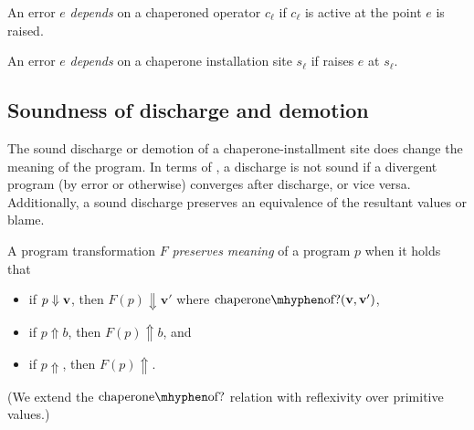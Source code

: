 
\begin{definition}
An error $e$ \emph{depends} on a chaperoned operator $c_\ell$ if $c_\ell$  is active at the point $e$ is raised.
\end{definition}


\begin{definition}
An error $e$ \emph{depends} on a chaperone installation site $s_\ell$ if  raises $e$ at $s_\ell$.
\end{definition}



\subsection{Soundness of discharge and demotion}

The sound discharge or demotion of a chaperone-installment site does change the meaning of the program.
In terms of \chapcalc, a discharge is not sound if a divergent program (by error or otherwise) converges after discharge, or vice versa.
Additionally, a sound discharge preserves an equivalence of the resultant values or blame.

\begin{definition}
A program transformation $F$ \emph{preserves meaning} of a program $p$ when it holds that
\begin{itemize}
\item if $p\Downarrow\mathbf{v}$, then $F(p)\Downarrow\mathbf{v'}$ where $\mathrm{chaperone\mhyphen of?}(\vv,\vvp)$,
\item if $p\Uparrow b$, then $F(p)\Uparrow b$, and
\item if $p\Uparrow$, then $F(p)\Uparrow$.
\end{itemize}
\end{definition}

(We extend the $\mathrm{chaperone\mhyphen of?}$ relation with reflexivity over primitive values.)

